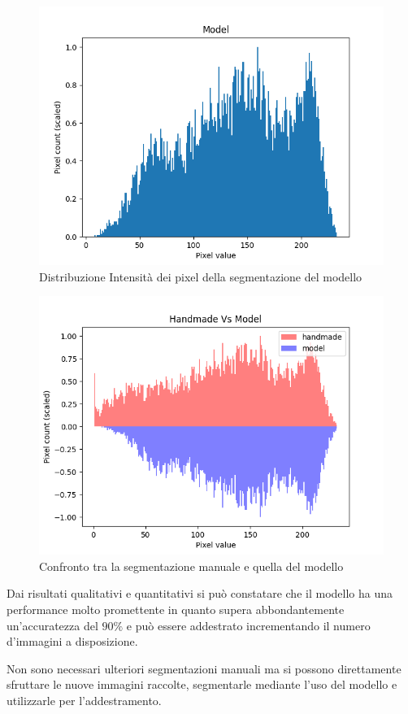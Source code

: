\begin{figure}[H]
    \centering
    \includegraphics[width=0.7\columnwidth]{Immagini/model_scaled_hist.png}
    \caption{Distribuzione Intensità dei pixel della segmentazione del modello}
    \label{fig:distribuzione intensità dei pixel della segmentazione del modello}
\end{figure}

\begin{figure}[H]
    \centering
    \includegraphics[width=0.7\columnwidth]{Immagini/handmade_vs_model_scaled.png}
    \caption{Confronto tra la segmentazione manuale e quella del modello}
    \label{fig:confronto tra la segmentazione manuale e quella del modello}
\end{figure}


Dai risultati qualitativi e quantitativi si pu\`o constatare che il modello ha una performance
molto promettente in quanto supera abbondantemente un'accuratezza del $90\%$ e pu\`o essere 
addestrato incrementando il numero d'immagini a disposizione. 

Non sono necessari ulteriori segmentazioni manuali ma si possono direttamente sfruttare
le nuove immagini raccolte, segmentarle mediante l'uso del modello e utilizzarle per l'addestramento.




